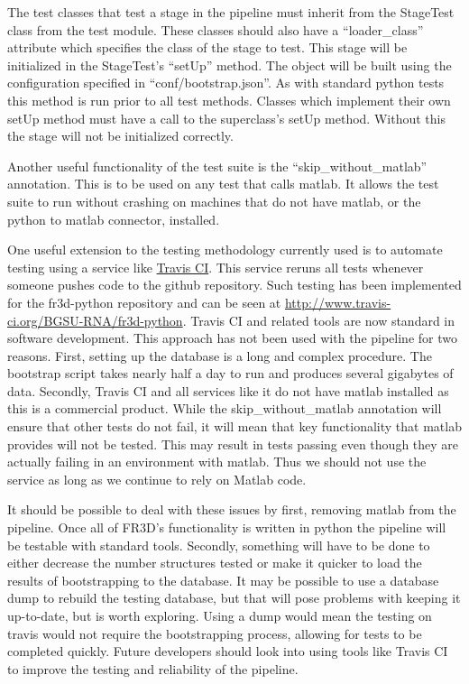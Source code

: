 The test classes that test a stage in the pipeline must inherit from the
StageTest class from the test module. These classes should also have a
``loader\_class'' attribute which specifies the class of the stage to test. This
stage will be initialized in the StageTest's ``setUp'' method. The object will be
built using the configuration specified in ``conf/bootstrap.json''. As with
standard python tests this method is run prior to all test methods. Classes
which implement their own setUp method must have a call to the superclass's
setUp method. Without this the stage will not be initialized correctly.

Another useful functionality of the test suite is the ``skip\_without\_matlab''
annotation. This is to be used on any test that calls matlab. It allows the test
suite to run without crashing on machines that do not have matlab, or the python
to matlab connector, installed.

One useful extension to the testing methodology currently used is to automate
testing using a service like \href{https://travis-ci.org/}{Travis CI}. This
service reruns all tests whenever someone pushes code to the github repository.
Such testing has been implemented for the fr3d-python repository and can be seen
at \url{http://www.travis-ci.org/BGSU-RNA/fr3d-python}. Travis CI and related tools
are now standard in software development. This approach has not been used with
the pipeline for two reasons. First, setting up the database is a long and
complex procedure. The bootstrap script takes nearly half a day to run and
produces several gigabytes of data. Secondly, Travis CI and all services like it
do not have matlab installed as this is a commercial product. While the
skip\_without\_matlab annotation will ensure that other tests do not fail, it will
mean that key functionality that matlab provides will not be tested. This may
result in tests passing even though they are actually failing in an environment
with matlab. Thus we should not use the service as long as we continue to rely
on Matlab code.

It should be possible to deal with these issues by first, removing matlab from
the pipeline. Once all of FR3D's functionality is written in python the pipeline
will be testable with standard tools. Secondly, something will have to be done
to either decrease the number structures tested or make it quicker to load the
results of bootstrapping to the database. It may be possible to use a database
dump to rebuild the testing database, but that will pose problems with keeping
it up-to-date, but is worth exploring. Using a dump would mean the testing on
travis would not require the bootstrapping process, allowing for tests to be
completed quickly. Future developers should look into using tools like Travis CI
to improve the testing and reliability of the pipeline.
